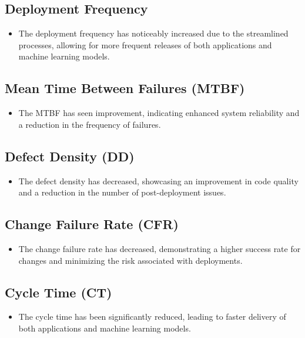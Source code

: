 \documentclass[12pt, letterpaper]{article}
\begin{document}
\subsection*{Deployment Frequency}

\begin{itemize}
    \item The deployment frequency has noticeably increased due to the streamlined processes, allowing for more frequent releases of both applications and machine learning models.
\end{itemize}

\subsection*{Mean Time Between Failures (MTBF)}

\begin{itemize}
    \item The MTBF has seen improvement, indicating enhanced system reliability and a reduction in the frequency of failures.
\end{itemize}

\subsection*{Defect Density (DD)}

\begin{itemize}
    \item The defect density has decreased, showcasing an improvement in code quality and a reduction in the number of post-deployment issues.
\end{itemize}

\subsection*{Change Failure Rate (CFR)}

\begin{itemize}
    \item The change failure rate has decreased, demonstrating a higher success rate for changes and minimizing the risk associated with deployments.
\end{itemize}

\subsection*{Cycle Time (CT)}

\begin{itemize}
    \item The cycle time has been significantly reduced, leading to faster delivery of both applications and machine learning models.
\end{itemize}
\end{document}
